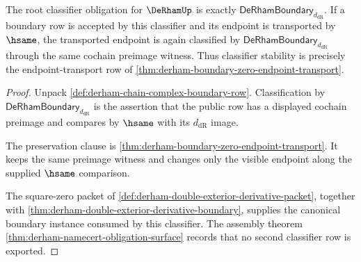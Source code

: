 \begin{theorem}
\label{thm:derham-root-classifier-obligation}
The root classifier obligation for $\DeRhamUp$ is exactly
$\mathsf{DeRhamBoundary}_{d_{\mathrm{dR}}}$. If a boundary row is accepted by
this classifier and its endpoint is transported by $\hsame$, the transported
endpoint is again classified by
$\mathsf{DeRhamBoundary}_{d_{\mathrm{dR}}}$ through the same cochain preimage
witness. Thus classifier stability is precisely the endpoint-transport row
of \autoref{thm:derham-boundary-zero-endpoint-transport}.
\end{theorem}
\begin{proof}
Unpack \autoref{def:derham-chain-complex-boundary-row}. Classification by
$\mathsf{DeRhamBoundary}_{d_{\mathrm{dR}}}$ is the assertion that the public
row has a displayed cochain preimage and compares by $\hsame$ with its
$d_{\mathrm{dR}}$ image.

The preservation clause is
\autoref{thm:derham-boundary-zero-endpoint-transport}. It keeps the same
preimage witness and changes only the visible endpoint along the supplied
$\hsame$ comparison.

The square-zero packet of
\autoref{def:derham-double-exterior-derivative-packet}, together with
\autoref{thm:derham-double-exterior-derivative-boundary}, supplies the
canonical boundary instance consumed by this classifier. The assembly theorem
\autoref{thm:derham-namecert-obligation-surface} records that no second
classifier row is exported.
\end{proof}

